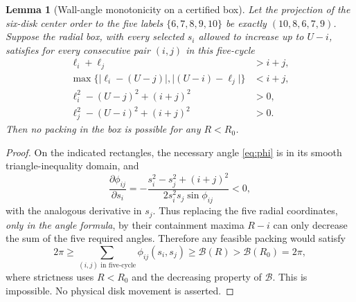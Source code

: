 \documentclass[11pt,a4paper]{article}
\newtheorem{lemma}[theorem]{Lemma}
\newcommand{\Rcap}{U}
\begin{document}
\begin{lemma}[Wall-angle monotonicity on a certified box]\label{lem:barrier}
Let the projection of the six-disk center order to the five labels
$\{6,7,8,9,10\}$ be exactly $(10,8,6,7,9)$.  Suppose the radial box,
with every selected $s_i$ allowed to increase up to $\Rcap-i$, satisfies
for every consecutive pair $(i,j)$ in this five-cycle
\begin{align*}
 \ell_i+\ell_j&>i+j,\\
 \max\{\lvert\ell_i-(\Rcap-j)\rvert,
         \lvert(\Rcap-i)-\ell_j\rvert\}&<i+j,\\
 \ell_i^2-(\Rcap-j)^2+(i+j)^2&>0,\\
 \ell_j^2-(\Rcap-i)^2+(i+j)^2&>0.
\end{align*}
Then no packing in the box is possible for any $R<R_0$.
\end{lemma}
\begin{proof}
On the indicated rectangles, the necessary angle
\eqref{eq:phi} is in its smooth triangle-inequality domain, and
\[
 \frac{\partial\phi_{ij}}{\partial s_i}
 =-\frac{s_i^2-s_j^2+(i+j)^2}
         {2s_i^2s_j\sin\phi_{ij}}<0,
\]
with the analogous derivative in $s_j$.  Thus replacing the five radial
coordinates, \emph{only in the angle formula}, by their containment maxima
$R-i$ can only decrease the sum of the five required angles.  Therefore
any feasible packing would satisfy
\[
 2\pi\ge\sum_{(i,j)\text{ in five-cycle}}\phi_{ij}(s_i,s_j)
        \ge\mathcal B(R)>\mathcal B(R_0)=2\pi,
\]
where strictness uses $R<R_0$ and the decreasing property of
$\mathcal B$.  This is impossible.  No physical disk movement is asserted.
\end{proof}
\end{document}
